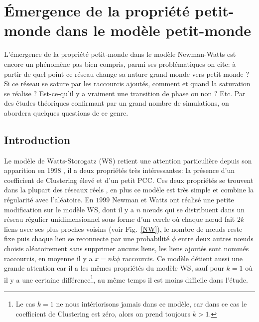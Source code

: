 \chapter{Émergence de la propriété petit-monde dans le modèle petit-monde}
L'émergence de la propriété petit-monde dans le modèle Newman-Watts est encore un phénomène pas bien compris, parmi ses problématiques on cite: à partir de quel point ce réseau change sa nature grand-monde vers petit-monde ? Si ce réseau se sature par les raccourcis ajoutés, comment et quand la saturation se réalise ? Est-ce-qu'il y a vraiment une transition de phase ou non ? Etc.
Par des études théoriques confirmant par un grand nombre de simulations, on abordera quelques questions de ce genre.
\section{Introduction}

Le modèle de Watts-Storogatz (WS) retient une attention particulière depuis son apparition en 1998 \cite{Watss-Strogatz1998}, il a deux propriétés très intéressantes: la présence d'un coefficient de Clustering élevé et d'un petit PCC. Ces deux propriétés se trouvent dans la plupart des réseaux réels \cite{Cohen-Havlinl2010,Newman2010}, en plus ce modèle est très simple et combine la régularité avec l'aléatoire. En $1999$ Newman et Watts \cite{Newman-Watts1999} ont réalisé une petite modification sur le modèle WS, dont il y a $n$ nœuds qui se distribuent dans un réseau régulier unidimensionnel sous forme d'un cercle où chaque nœud fait $2k$ liens avec ses plus proches voisins (voir Fig.~\ref{NW}), le nombre de nœuds reste fixe puis chaque lien se reconnecte par une probabilité $\phi$ entre deux autres nœuds choisis aléatoirement sans supprimer aucuns liens, les liens ajoutés sont nommés raccourcis, en moyenne il y a $x=nk\phi$ raccourcis. Ce modèle détient aussi une grande attention car il a les m\^{e}mes propriétés du modèle WS, sauf pour $k=1$ où il y a une certaine différence\footnote{Le cas $k=1$ ne nous intériorisons jamais dans ce modèle, car dans ce cas le coefficient de Clustering est zéro, alors on prend toujours $k>1$. }, au m\^{e}me temps il est moins difficile dans l'étude.


